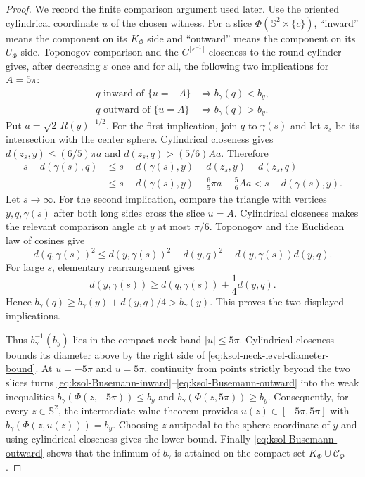 \documentclass[10pt]{coll-l}
\newcommand{\Sph}{\mathbb{S}}
\theoremstyle{definition}
\theoremstyle{remark}
\numberwithin{section}{chapter}
\numberwithin{equation}{chapter}
\begin{document}
\begin{proof}
We record the finite comparison argument used later.  Use the oriented
cylindrical coordinate $u$ of the chosen witness.  For a slice
$\Phi(\Sph^2\times\{c\})$, ``inward'' means the component on its
$K_\Phi$ side and ``outward'' means the component on its $U_\Phi$ side.
Toponogov comparison and the
$C^{\lceil\varepsilon^{-1}\rceil}$ closeness to the round cylinder gives,
after decreasing $\bar\varepsilon$ once and for all, the following two
implications for
$A=5\pi$:
\begin{align}
 q\text{ inward of }\{u=-A\}
     &\Longrightarrow b_\gamma(q)<b_y,                 \label{eq:ksol-Busemann-inward}\\
 q\text{ outward of }\{u=A\}
     &\Longrightarrow b_\gamma(q)>b_y.                 \label{eq:ksol-Busemann-outward}
\end{align}
Put $a=\sqrt2\,R(y)^{-1/2}$.  For the first implication, join $q$ to
$\gamma(s)$ and let $z_s$ be its intersection with the center sphere.
Cylindrical closeness gives
$d(z_s,y)\leq(6/5)\pi a$ and
$d(z_s,q)>(5/6)Aa$.  Therefore
\begin{align*}
 s-d(\gamma(s),q)
 &\leq s-d(\gamma(s),y)+d(z_s,y)-d(z_s,q)\\
 &\leq s-d(\gamma(s),y)
       +\frac65\pi a-\frac56Aa
 <s-d(\gamma(s),y).
\end{align*}
Let $s\to\infty$.  For the second implication, compare the triangle with
vertices $y,q,\gamma(s)$ after both long sides cross the slice $u=A$.
Cylindrical closeness makes the relevant comparison angle at $y$ at most
$\pi/6$.  Toponogov and the Euclidean law of cosines give
\[
 d(q,\gamma(s))^2
 \leq d(y,\gamma(s))^2+d(y,q)^2
       -d(y,\gamma(s))d(y,q).
\]
For large $s$, elementary rearrangement gives
\[
 d(y,\gamma(s))
 \geq d(q,\gamma(s))+\frac14d(y,q).
\]
Hence
$b_\gamma(q)\geq b_\gamma(y)+d(y,q)/4>b_\gamma(y)$.
This proves the two displayed implications.

Thus $b_\gamma^{-1}(b_y)$ lies in the compact neck band $|u|\leq5\pi$.
Cylindrical closeness bounds its diameter above by the right side of
\eqref{eq:ksol-neck-level-diameter-bound}.  At $u=-5\pi$ and $u=5\pi$,
continuity from points strictly beyond the two slices turns
\eqref{eq:ksol-Busemann-inward}--\eqref{eq:ksol-Busemann-outward} into the
weak inequalities $b_\gamma(\Phi(z,-5\pi))\leq b_y$ and
$b_\gamma(\Phi(z,5\pi))\geq b_y$.  Consequently, for every
$z\in\Sph^2$, the intermediate value theorem provides
$u(z)\in[-5\pi,5\pi]$ with
$b_\gamma(\Phi(z,u(z)))=b_y$.  Choosing $z$ antipodal to the sphere
coordinate of $y$ and using cylindrical closeness gives the lower bound.
Finally \eqref{eq:ksol-Busemann-outward} shows that the infimum of
$b_\gamma$ is attained on the compact set $K_\Phi\cup\mathcal C_\Phi$.
\end{proof}
\end{document}
